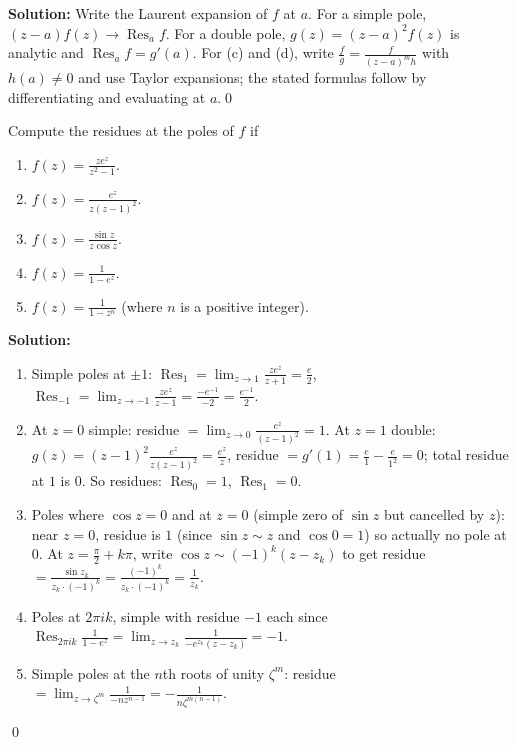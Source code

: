 \noindent\textbf{Solution:}
Write the Laurent expansion of $f$ at $a$. For a simple pole, $(z-a)f(z)\to\operatorname{Res}_a f$. For a double pole, $g(z)=(z-a)^2 f(z)$ is analytic and $\operatorname{Res}_a f=g'(a)$. For (c) and (d), write $\frac{f}{g}=\frac{f}{(z-a)^m h}$ with $h(a)\ne0$ and use Taylor expansions; the stated formulas follow by differentiating and evaluating at $a$.\qed


\begin{problembox}
Compute the residues at the poles of \( f \) if
\begin{enumerate}[label=(\alph*)]
\item \( f(z) = \frac{ze^z}{z^2 - 1} \).
\item \( f(z) = \frac{e^z}{z(z - 1)^2} \).
\item \( f(z) = \frac{\sin z}{z \cos z} \).
\item \( f(z) = \frac{1}{1 - e^z} \).
\item \( f(z) = \frac{1}{1 - z^n} \) (where \( n \) is a positive integer).
\end{enumerate}
\end{problembox}

\noindent\textbf{Solution:}
\begin{enumerate}[label=(\alph*)]
\item Simple poles at $\pm1$: $\operatorname{Res}_{1}=\lim_{z\to1}\frac{ze^z}{z+1}=\tfrac{e}{2}$, $\operatorname{Res}_{-1}=\lim_{z\to-1}\frac{ze^z}{z-1}=\tfrac{-e^{-1}}{-2}=\tfrac{e^{-1}}{2}$.
\item At $z=0$ simple: residue $=\lim_{z\to0}\frac{e^z}{(z-1)^2}=1$. At $z=1$ double: $g(z)=(z-1)^2\frac{e^z}{z(z-1)^2}=\frac{e^z}{z}$, residue $=g'(1)=\frac{e}{1}-\frac{e}{1^2}=0$; total residue at $1$ is $0$. So residues: $\operatorname{Res}_0=1$, $\operatorname{Res}_1=0$.
\item Poles where $\cos z=0$ and at $z=0$ (simple zero of $\sin z$ but cancelled by $z$): near $z=0$, residue is $1$ (since $\sin z\sim z$ and $\cos 0=1$) so actually no pole at $0$. At $z=\frac{\pi}{2}+k\pi$, write $\cos z\sim (-1)^k(z-z_k)$ to get residue $=\frac{\sin z_k}{z_k\cdot(-1)^k}=\frac{(-1)^k}{z_k\cdot(-1)^k}=\frac{1}{z_k}$.
\item Poles at $2\pi i k$, simple with residue $-1$ each since $\operatorname{Res}_{2\pi i k}\frac{1}{1-e^z}=\lim_{z\to z_k}\frac{1}{-e^{z_k}(z-z_k)}=-1$.
\item Simple poles at the $n$th roots of unity $\zeta^m$: residue $=\lim_{z\to\zeta^m}\frac{1}{-n z^{n-1}}=-\frac{1}{n\zeta^{m(n-1)}}$.
\end{enumerate}\qed


